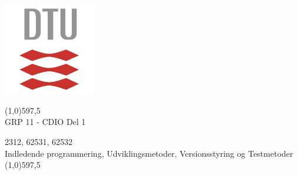 \begin{titlepage}
    \begin{center}
        \thispagestyle{empty}
        
        \vspace*{1cm}
        \includegraphics[width=0.3\textwidth]{00 Ressourcer/DTU-logo.png}
        
        \line(1,0){597,5} \\
        \huge
        GRP 11 - CDIO Del 1
        
        \vspace{0.5cm}
        \small
        2312, 62531, 62532 \\
        Indledende programmering, Udviklingsmetoder, Versionsstyring og Testmetoder \\
        \line(1,0){597,5}
        \vspace{0.7cm}
        

\end{center}
\end{titlepage}
